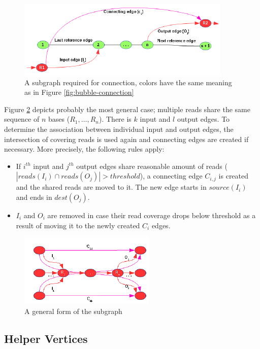 \begin{figure}[h]
	\centering
	\includegraphics{img/connection-general.pdf}
	\caption{A subgraph required for connection, colors have the same meaning as in Figure \ref{fig:bubble-connection}}
	\label{fig:connection-general}
\end{figure}

Figure \ref{fig:connection-abstract} depicts probably the most general case; multiple reads share the same sequence of $n$ bases ($R_1, \ldots, R_n$). There is $k$ input and $l$ output edges. To determine the association between individual input and output edges, the intersection of covering reads is used again and connecting edges are created if necessary. More precisely, the following rules apply:
\begin{itemize}
\item If $i^{th}$ input and $j^{th}$ output edges share reasonable amount of reads ($|reads(I_i) \cap reads(O_j)| > threshold$), a connecting edge $C_{i,j}$ is created and the shared reads are moved to it. The new edge starts in $source(I_i)$ and ends in $dest(O_j)$.
\item $I_i$ and $O_i$ are removed in case their read coverage drops below threshold as a result of moving it to the newly created $C_i$ edges. 
\end{itemize}

\begin{figure}[h]
	\centering
	\includegraphics{img/connection-abstract.pdf}
	\caption{A general form of the subgraph}
	\label{fig:connection-abstract}
\end{figure}

\subsection{Helper Vertices}
\label{subsec:helper-vertices}

